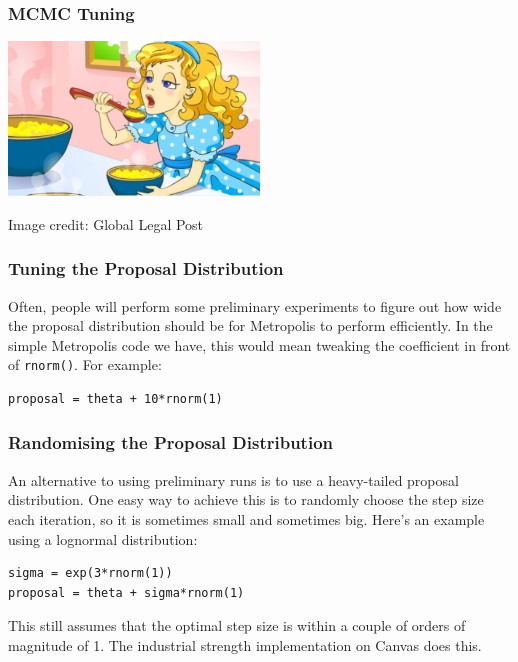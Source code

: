 \documentclass{beamer}
\begin{document}
\begin{frame}
\frametitle{MCMC Tuning}

\centering
\includegraphics[width=0.5\textwidth]{images/goldilocks.png}

Image credit: Global Legal Post

\end{frame}



\begin{frame}[fragile]
\frametitle{Tuning the Proposal Distribution}
Often, people will perform some preliminary experiments to figure out how
wide the proposal distribution should be for Metropolis to perform efficiently.
In the simple Metropolis code we have, this would mean tweaking the
coefficient in front of \texttt{rnorm()}. For example:

\begin{verbatim}
proposal = theta + 10*rnorm(1)
\end{verbatim}

\end{frame}



\begin{frame}[fragile]
\frametitle{Randomising the Proposal Distribution}
An alternative to using preliminary runs is to use a heavy-tailed proposal
distribution. One easy way to achieve this is to randomly choose the step
size each iteration, so it is sometimes small and sometimes big.
Here's an example using a lognormal distribution:

\begin{verbatim}
sigma = exp(3*rnorm(1))
proposal = theta + sigma*rnorm(1)
\end{verbatim}

\pause

This still assumes that the optimal step size is within a couple of orders
of magnitude of 1. The industrial strength implementation on Canvas does this.

\end{frame}
\end{document}

